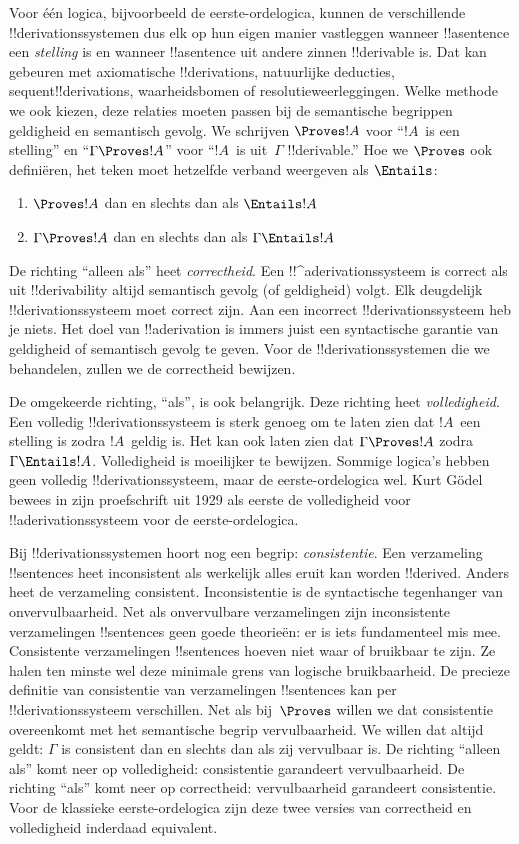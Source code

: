 \documentclass[../../../include/open-logic-section]{subfiles}
\begin{document}
Voor één logica, bijvoorbeeld de eerste-ordelogica, kunnen de
verschillende !!{derivation}ssystemen dus elk op hun eigen manier
vastleggen wanneer !!a{sentence} een \emph{stelling} is en wanneer
!!a{sentence} uit andere zinnen !!{derivable} is. Dat kan gebeuren met
axiomatische !!{derivation}s, natuurlijke deducties,
sequent!!{derivation}s, waarheidsbomen of resolutieweerleggingen. Welke
methode we ook kiezen, deze relaties moeten passen bij de semantische
begrippen geldigheid en semantisch gevolg. We schrijven $\Proves !A$
voor ``$!A$~is een stelling'' en ``$\Gamma \Proves !A$'' voor
``$!A$~is uit~$\Gamma$ !!{derivable}.'' Hoe we $\Proves$ ook
definiëren, het teken moet hetzelfde verband weergeven als $\Entails$:
\begin{enumerate}
\item $\Proves !A$ dan en slechts dan als $\Entails !A$
\item $\Gamma \Proves !A$ dan en slechts dan als $\Gamma \Entails !A$
\end{enumerate}
De richting ``alleen als'' heet \emph{correctheid}. Een
!!^a{derivation}ssysteem is correct als uit !!{derivability} altijd
semantisch gevolg (of geldigheid) volgt. Elk deugdelijk
!!{derivation}ssysteem moet correct zijn. Aan een incorrect
!!{derivation}ssysteem heb je niets. Het doel van !!a{derivation} is
immers juist een syntactische garantie van geldigheid of semantisch
gevolg te geven. Voor de !!{derivation}ssystemen die we behandelen,
zullen we de correctheid bewijzen.

De omgekeerde richting, ``als'', is ook belangrijk. Deze richting heet
\emph{volledigheid}. Een volledig !!{derivation}ssysteem is sterk
genoeg om te laten zien dat $!A$~een stelling is zodra $!A$~geldig is.
Het kan ook laten zien dat $\Gamma \Proves !A$ zodra
$\Gamma \Entails !A$. Volledigheid is moeilijker te bewijzen. Sommige
logica's hebben geen volledig !!{derivation}ssysteem, maar de
eerste-ordelogica wel. Kurt G\"odel bewees in zijn proefschrift uit
1929 als eerste de volledigheid voor !!a{derivation}ssysteem voor de
eerste-ordelogica.

Bij !!{derivation}ssystemen hoort nog een begrip:
\emph{consistentie}. Een verzameling !!{sentence}s heet inconsistent
als werkelijk alles eruit kan worden !!{derive}d. Anders heet de
verzameling consistent. Inconsistentie is de syntactische tegenhanger
van onvervulbaarheid. Net als onvervulbare verzamelingen zijn
inconsistente verzamelingen !!{sentence}s geen goede theorieën: er is
iets fundamenteel mis mee. Consistente verzamelingen !!{sentence}s
hoeven niet waar of bruikbaar te zijn. Ze halen ten minste wel deze
minimale grens van logische bruikbaarheid. De precieze definitie van
consistentie van verzamelingen !!{sentence}s kan per
!!{derivation}ssysteem verschillen. Net als bij~$\Proves$ willen we
dat consistentie overeenkomt met het semantische begrip
vervulbaarheid. We willen dat altijd geldt: $\Gamma$ is consistent
dan en slechts dan als zij vervulbaar is. De richting ``alleen als''
komt neer op volledigheid: consistentie garandeert vervulbaarheid. De
richting ``als'' komt neer op correctheid: vervulbaarheid garandeert
consistentie. Voor de klassieke eerste-ordelogica zijn deze twee
versies van correctheid en volledigheid inderdaad equivalent.
\end{document}
